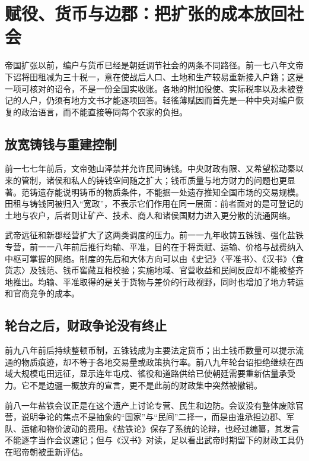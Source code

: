 \section{赋役、货币与边郡：把扩张的成本放回社会}
\label{sec:western-han-fiscal-society-frontier}

帝国扩张以前，编户与货币已经是朝廷调节社会的两条不同路径。前一七八年文帝下诏将田租减为三十税一，意在使战后人口、土地和生产较易重新接入户籍；这是一项可核对的诏令，不是一份全国实收账。各地的附加役使、实际税率以及未被登记的人户，仍须有地方文书才能逐项回答。轻徭薄赋因而首先是一种中央对编户恢复的政治语言，而不能直接等同每个农家的负担。

\subsection{放宽铸钱与重建控制}

前一七七年前后，文帝弛山泽禁并允许民间铸钱。中央财政有限、又希望松动秦以来的管制，诸侯和私人的铸钱空间随之扩大；钱币质量与地方财力的问题也更显著。范铸遗存能说明铸币的物质条件，不能据一处遗存推知全国市场的交易规模。田租与铸钱同被归入“宽政”，不表示它们作用在同一层面：前者面对的是可登记的土地与农户，后者则让矿产、技术、商人和诸侯国财力进入更分散的流通网络。

武帝远征和新郡经营扩大了这两类调度的压力。前一一九年收铸五铢钱、强化盐铁专营，前一一八年前后推行均输、平准，目的在于将贡赋、运输、价格与战费纳入中枢可掌握的网络。制度的先后和大体方向可以由《史记》〈平准书〉、《汉书》〈食货志〉及钱范、钱币窖藏互相校验；实施地域、官营收益和民间反应却不能被整齐地推出。均输、平准取得的是关于货物与差价的行政视野，同时也增加了地方转运和官商竞争的成本。

\subsection{轮台之后，财政争论没有终止}

前九八年前后持续整顿币制，五铢钱成为主要法定货币；出土钱币数量可以提示流通的物质痕迹，却不等于各地交易量或政策执行率。前八九年轮台诏拒绝继续在西域大规模屯田远征，显示连年屯戍、徭役和道路供给已使朝廷需要重新估量承受力。它不是边疆一概放弃的宣言，更不是此前的财政集中突然被撤销。

前八一年盐铁会议正是在这个遗产上讨论专营、民生和边防。会议没有整体废除官营，说明争论的焦点不是抽象的“国家”与“民间”二择一，而是由谁承担边郡、军队、运输和物价波动的费用。《盐铁论》保存了系统的论辩，也经过编纂，其发言不能逐字当作会议速记；但与《汉书》对读，足以看出武帝时期留下的财政工具仍在昭帝朝被重新评估。

